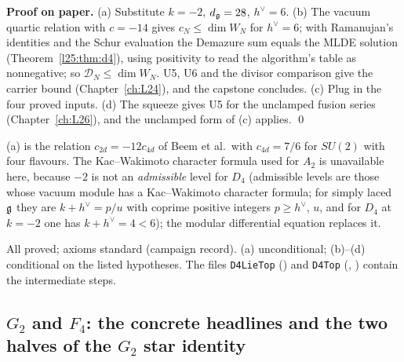 \textbf{Proof on paper.} (a) Substitute $k=-2$, $d_{\mathfrak g}=28$, $h^\vee=6$. (b) The vacuum quartic relation with $c=-14$ gives
$c_N\le\dim W_N$ for $h^\vee=6$; with Ramanujan's identities and the Schur evaluation the Demazure sum equals the MLDE solution
(Theorem~\ref{l25:thm:d4}), using positivity to read the algorithm's table as nonnegative; so $\mathcal D_N\le\dim W_N$. U5, U6 and the
divisor comparison give the carrier bound (Chapter~\ref{ch:L24}), and the capstone concludes. (c) Plug in the four proved inputs.
(d) The squeeze gives U5 for the unclamped fusion series (Chapter~\ref{ch:L26}), and the unclamped form of (c) applies. \qed

\begin{physics}
(a) is the relation $c_{2d}=-12c_{4d}$ of Beem et al.\ with $c_{4d}=7/6$ for $SU(2)$ with four flavours. The Kac--Wakimoto character formula
used for $A_2$ is unavailable here, because $-2$ is not an \emph{admissible} level for $D_4$ (admissible levels are those whose vacuum
module has a Kac--Wakimoto character formula; for simply laced $\mathfrak g$ they are $k+h^\vee=p/u$ with coprime positive integers
$p\ge h^\vee$, $u$, and for $D_4$ at $k=-2$ one has $k+h^\vee=4<6$); the modular differential equation replaces it.
\end{physics}

\begin{status}
All proved; axioms standard (campaign record). (a) unconditional; (b)--(d) conditional on the listed hypotheses. The files
\texttt{D4LieTop} () and \texttt{D4Top} (, ) contain the
intermediate steps.
\end{status}

\subsection{\texorpdfstring{$G_2$}{G2} and \texorpdfstring{$F_4$}{F4}: the concrete headlines and the two halves of the \texorpdfstring{$G_2$}{G2} star identity}

